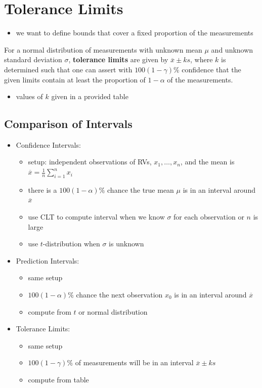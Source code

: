 \documentclass[10pt]{article}
\begin{document}
\section{Tolerance Limits}
\begin{itemize}
    \item we want to define bounds that cover a fixed proportion of the measurements
\end{itemize}
\begin{definition}
    For a normal distribution of measurements with unknown mean $\mu$ and unknown standard deviation $\sigma$, \textbf{tolerance limits} are given by $\overline{x} \pm ks$, where $k$ is determined such that one can assert with $100(1-\gamma)\%$ confidence that the given limits contain at least the proportion of $1-\alpha$ of the measurements. 
    \begin{itemize}
        \item values of $k$ given in a provided table
    \end{itemize}
\end{definition}

\subsection{Comparison of Intervals}
\begin{itemize}
    \item Confidence Intervals:
        \begin{itemize}
            \item setup: independent observations of RVs, $x_1, \ldots, x_n$, and the mean is $\overline{x}=\frac{1}{n}\sum_{i=1}^{n} x_i$ 
            \item there is a $100(1-\alpha)\%$ chance the true mean $\mu$ is in an interval around $\overline{x}$
            \item use CLT to compute interval when we know $\sigma$ for each observation or $n$ is large 
            \item use $t$-distribution when $\sigma$ is unknown
        \end{itemize}
    \item Prediction Intervals:
        \begin{itemize}
            \item same setup 
            \item $100(1-\alpha)\%$ chance the next observation $x_0$ is in an interval around $\overline{x}$ 
            \item compute from $t$ or normal distribution
        \end{itemize}
    \item Tolerance Limits:
        \begin{itemize}
            \item same setup 
            \item $100(1-\gamma)\%$ of measurements will be in an interval $\overline{x} \pm ks$ 
            \item compute from table
        \end{itemize}
\end{itemize}
\end{document}

